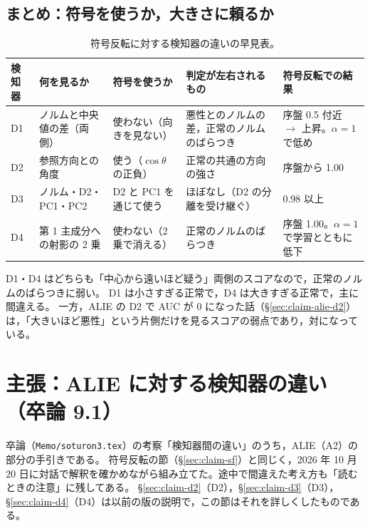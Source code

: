 \documentclass[a4j, dvipdfmx]{jsarticle}  %
\begin{document}
\subsection{まとめ：符号を使うか，大きさに頼るか}
\label{sec:claim-sf-summary}

\begin{table}[H]
\centering
\caption{符号反転に対する検知器の違いの早見表。}
\label{tab:sf-summary}
\small
\begin{tabular}{@{}l P{3.3cm} P{2.2cm} P{4.4cm} P{4.0cm}@{}}
\toprule
検知器 & 何を見るか & 符号を使うか & 判定が左右されるもの & 符号反転での結果 \\
\midrule
D1 & ノルムと中央値の差（両側） & 使わない（向きを見ない） & 悪性とのノルムの差，正常のノルムのばらつき & 序盤 0.5 付近 $\rightarrow$ 上昇。$\alpha = 1$ で低め \\
D2 & 参照方向との角度 & 使う（$\cos\theta$ の正負） & 正常の共通の方向の強さ & 序盤から 1.00 \\
D3 & ノルム・D2・PC1・PC2 & D2 と PC1 を通じて使う & ほぼなし（D2 の分離を受け継ぐ） & 0.98 以上 \\
D4 & 第 1 主成分への射影の 2 乗 & 使わない（2 乗で消える） & 正常のノルムのばらつき & 序盤 1.00。$\alpha = 1$ で学習とともに低下 \\
\bottomrule
\end{tabular}
\end{table}

D1・D4 はどちらも「中心から遠いほど疑う」両側のスコアなので，正常のノルムのばらつきに弱い。
D1 は小さすぎる正常で，D4 は大きすぎる正常で，主に間違える。
一方，ALIE の D2 で AUC が 0 になった話（\S\ref{sec:claim-alie-d2}）は，「大きいほど悪性」という片側だけを見るスコアの弱点であり，対になっている。

\section{主張：ALIE に対する検知器の違い（卒論 9.1）}
\label{sec:claim-alie}

卒論（\texttt{Memo/soturon3.tex}）の考察「検知器間の違い」のうち，ALIE（A2）の部分の手引きである。
符号反転の節（\S\ref{sec:claim-sf}）と同じく，2026 年 10 月 20 日に対話で解釈を確かめながら組み立てた。途中で間違えた考え方も「読むときの注意」に残してある。
\S\ref{sec:claim-d2}（D2），\S\ref{sec:claim-d3}（D3），\S\ref{sec:claim-d4}（D4）は以前の版の説明で，この節はそれを詳しくしたものである。
\end{document}
